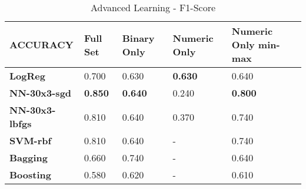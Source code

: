 \documentclass[10pt, conference, compsocconf]{IEEEtran}
\begin{document}
\begin{center}
	\begin{table}[t]
		\centering \footnotesize
		\vspace{0.01cm}
		\caption{Advanced Learning - F1-Score}
		\hspace{1cm}
		\begin{tabularx}{\linewidth}{ l  X  X  X  X }
			\hline
			\textbf{ACCURACY} &	\textbf{Full Set}&	\textbf{Binary Only}&	\textbf{Numeric Only}&	\textbf{Numeric Only min-max} \\ \hline
			
			
			\textbf{LogReg}&	0.700&	0.630&	\textbf{0.630}&	0.640 \\ \hline
			\textbf{NN-30x3-sgd}&	\textbf{0.850}&	\textbf{0.640}&	0.240&	\textbf{0.800} \\ \hline
			\textbf{NN-30x3-lbfgs}&	0.810&	0.640&	0.370&	0.740 \\ \hline
			\textbf{SVM-rbf}&	0.810&	0.640&	-&	0.740 \\ \hline
			\textbf{Bagging}&	0.660&	0.740&	-&	0.640 \\ \hline
			\textbf{Boosting}&	0.580&	0.620&	-&	0.610 \\ \hline
			
			
		\end{tabularx}\newline
		\vspace{-0.05cm}
		\label{Table6}
	\end{table} \hfil
\end{center}
\end{document}
